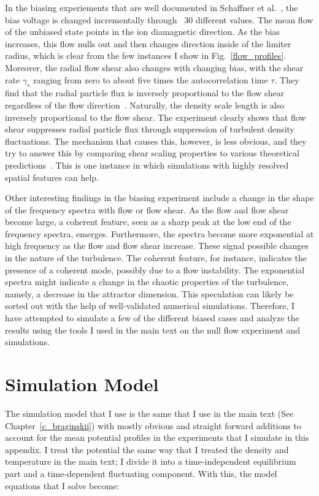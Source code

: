 In the biasing experiements that are well documented in Schaffner et al.~\cite{schaffner2012,schaffner2013}, the bias voltage is changed incrementally through ~30 different values. 
The mean flow of the unbiased state points in the ion diamagnetic direction. As the bias increases, this flow nulls out and then changes direction inside of the limiter radius, which is
clear from the few instances I show in Fig.~\ref{flow_profiles}. Moreover, the radial flow shear also changes with changing bias, with the shear rate $\gamma_s$ ranging from zero to about five times
the autocorrelation time $\tau$. They find that the radial particle flux is inversely proportional to the flow shear regardless of the flow direction~\cite{schaffner2012}. 
Naturally, the density scale length is also inversely proportional to the flow shear. The experiment clearly shows that flow shear suppresses radial particle flux through suppression of turbulent
density fluctuations. 
The mechanism that causes this, however, is less obvious, and they try to answer this by comparing shear scaling properties to various theoretical predictions~\cite{schaffner2013}.
This is one instance in which simulations with highly resolved spatial features can help.

Other interesting findings in the biasing experiment include a change in the shape of the frequency spectra with flow or flow shear. As the flow and flow shear become large, a coherent feature,
seen as a sharp peak at the low end of the frequency spectra, emerges. Furthermore, the spectra become more exponential at high frequency as the flow and flow shear increase. These signal
possible changes in the nature of the turbulence. The coherent feature, for instance, indicates the presence of a coherent mode, possibly due to a flow instability. The exponential spectra
might indicate a change in the chaotic properties of the turbulence, namely, a decrease in the attractor dimension. This speculation can likely be sorted out with
the help of well-validated numerical simulations. Therefore, I have attempted to simulate a few of the different biased cases and analyze the results using the tools I used in the main
text on the null flow experiment and simulations.



\section{Simulation Model}
\label{s_sim_model}

The simulation model that I use is the same that I use in the main text (See Chapter~\ref{c_braginskii}) with mostly obvious and straight forward additions to account for the mean potential
profiles in the experiments that I simulate in this appendix. I treat the potential the same way that I treated the density and temperature in the main text; I divide it into a time-independent
equilibrium part and a time-dependent fluctuating component. With this, the model equations that I solve become:

